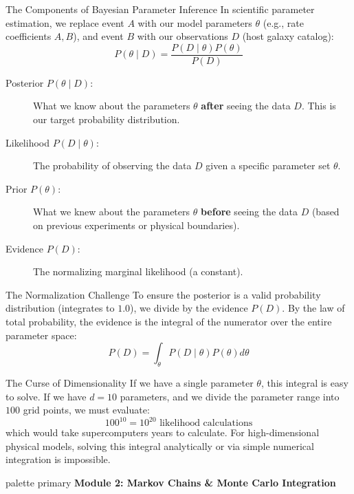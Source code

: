 \documentclass[9pt]{beamer}
\begin{document}
\begin{frame}{The Components of Bayesian Parameter Inference}
  In scientific parameter estimation, we replace event $A$ with our model parameters $\theta$ (e.g., rate coefficients $A, B$), and event $B$ with our observations $D$ (host galaxy catalog):
  $$P(\theta \mid D) = \frac{P(D \mid \theta) P(\theta)}{P(D)}$$
  \begin{description}
    \item[Posterior $P(\theta \mid D)$:] What we know about the parameters $\theta$ \textbf{after} seeing the data $D$. This is our target probability distribution.
    \item[Likelihood $P(D \mid \theta)$:] The probability of observing the data $D$ given a specific parameter set $\theta$.
    \item[Prior $P(\theta)$:] What we knew about the parameters $\theta$ \textbf{before} seeing the data $D$ (based on previous experiments or physical boundaries).
    \item[Evidence $P(D)$:] The normalizing marginal likelihood (a constant).
  \end{description}
\end{frame}

\begin{frame}{The Normalization Challenge}
  To ensure the posterior is a valid probability distribution (integrates to $1.0$), we divide by the evidence $P(D)$. By the law of total probability, the evidence is the integral of the numerator over the entire parameter space:
  $$P(D) = \int_{\theta} P(D \mid \theta) P(\theta) d\theta$$
  \begin{alertblock}{The Curse of Dimensionality}
    If we have a single parameter $\theta$, this integral is easy to solve. If we have $d=10$ parameters, and we divide the parameter range into $100$ grid points, we must evaluate:
    $$100^{10} = 10^{20} \text{ likelihood calculations}$$
    which would take supercomputers years to calculate. For high-dimensional physical models, solving this integral analytically or via simple numerical integration is impossible.
  \end{alertblock}
\end{frame}

\begin{frame}[plain]
  \vfill
  \centering
  \begin{beamercolorbox}[sep=8pt,center,shadow=true,rounded=true]{palette primary}
    \textbf{Module 2: Markov Chains \& Monte Carlo Integration}
  \end{beamercolorbox}
  \vfill
\end{frame}
\end{document}
